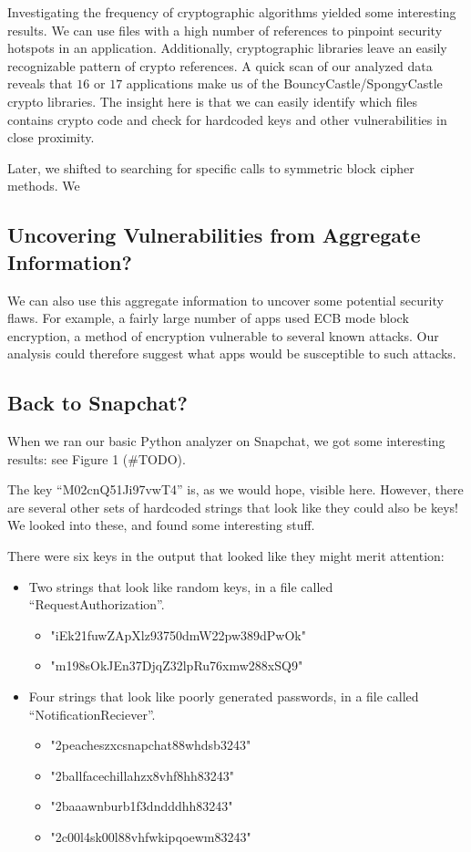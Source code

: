 \documentclass[11pt]{article}
\numberwithin{theorem}{subsection}
\begin{document}
  Investigating the frequency of cryptographic algorithms yielded some interesting results. We can use
files with a high number of references to pinpoint security hotspots in an application. Additionally, 
cryptographic libraries leave an easily recognizable pattern of crypto references. A quick scan
of our analyzed data reveals that $16$ or $17$ applications make us of the BouncyCastle/SpongyCastle crypto
libraries. The insight here is that we can easily identify which files contains crypto code and check
for hardcoded keys and other vulnerabilities in close proximity.

  Later, we shifted to searching for specific calls to symmetric block cipher methods. We 
  
\subsection{Uncovering Vulnerabilities from Aggregate Information?}

We can also use this aggregate information to uncover some potential security flaws.  For example, a fairly large number
of apps used ECB mode block encryption, a method of encryption vulnerable to several known attacks.  Our analysis could
therefore suggest what apps would be susceptible to such attacks.

\subsection{Back to Snapchat?}

When we ran our basic Python analyzer on Snapchat, we got some interesting results: see Figure 1 (\#TODO).

The key ``M02cnQ51Ji97vwT4'' is, as we would hope, visible here.  However, there are several other sets of
hardcoded strings that look like they could also be keys!  We looked into these, and found some interesting stuff.

There were six keys in the output that looked like they might merit attention:

\begin{itemize}
\item Two strings that look like random keys, in a file called ``RequestAuthorization''. 
\begin{itemize}
\item "iEk21fuwZApXlz93750dmW22pw389dPwOk"
\item "m198sOkJEn37DjqZ32lpRu76xmw288xSQ9"
\end{itemize}
\item Four strings that look like poorly generated passwords, in a file called ``NotificationReciever''.
\begin{itemize}
\item "2peacheszxcsnapchat88whdsb3243"
\item "2ballfacechillahzx8vhf8hh83243"
\item "2baaawnburb1f3dndddhh83243"
\item "2c00l4sk00l88vhfwkipqoewm83243"
\end{itemize}
\end{itemize}
\end{document}
